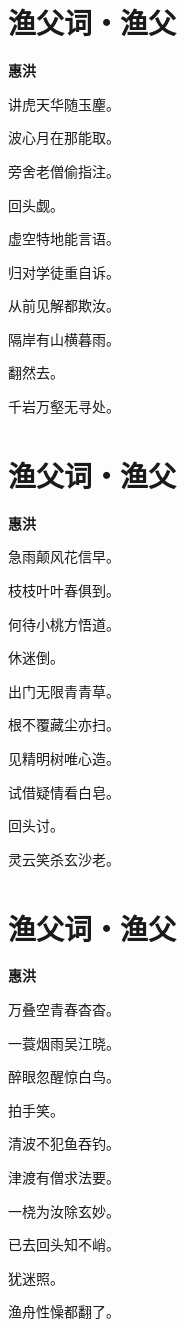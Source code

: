 \documentclass[12pt,a4paper]{ctexbook}
\begin{document}
\section{渔父词・渔父}
\textbf{惠洪}\par\vspace{0.5em}
讲虎天华随玉麈。\par
波心月在那能取。\par
旁舍老僧偷指注。\par
回头觑。\par
虚空特地能言语。\par
归对学徒重自诉。\par
从前见解都欺汝。\par
隔岸有山横暮雨。\par
翻然去。\par
千岩万壑无寻处。\par

\section{渔父词・渔父}
\textbf{惠洪}\par\vspace{0.5em}
急雨颠风花信早。\par
枝枝叶叶春俱到。\par
何待小桃方悟道。\par
休迷倒。\par
出门无限青青草。\par
根不覆藏尘亦扫。\par
见精明树唯心造。\par
试借疑情看白皂。\par
回头讨。\par
灵云笑杀玄沙老。\par

\section{渔父词・渔父}
\textbf{惠洪}\par\vspace{0.5em}
万叠空青春杳杳。\par
一蓑烟雨吴江晓。\par
醉眼忽醒惊白鸟。\par
拍手笑。\par
清波不犯鱼吞钓。\par
津渡有僧求法要。\par
一桡为汝除玄妙。\par
已去回头知不峭。\par
犹迷照。\par
渔舟性懆都翻了。\par
\end{document}
